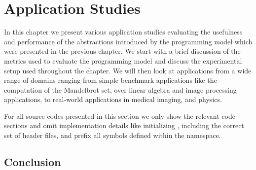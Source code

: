 \chapter{Application Studies}
\label{chapter:skelcl-evaluation}

In this chapter we present various application studies evaluating the usefulness and performance of the abstractions introduced by the \SkelCL programming model which were presented in the previous chapter.
We start with a brief discussion of the metrics used to evaluate the \SkelCL programming model and discuss the experimental setup used throughout the chapter.
We will then look at applications from a wide range of domains ranging from simple benchmark applications like the computation of the Mandelbrot set, over linear algebra and image processing applications, to real-world applications in medical imaging, and physics.

For all source codes presented in this section we only show the relevant code sections and omit implementation details like initializing \SkelCL, including the correct set of header files, and prefix all symbols defined within the  namespace.















% 

\section{Conclusion}

